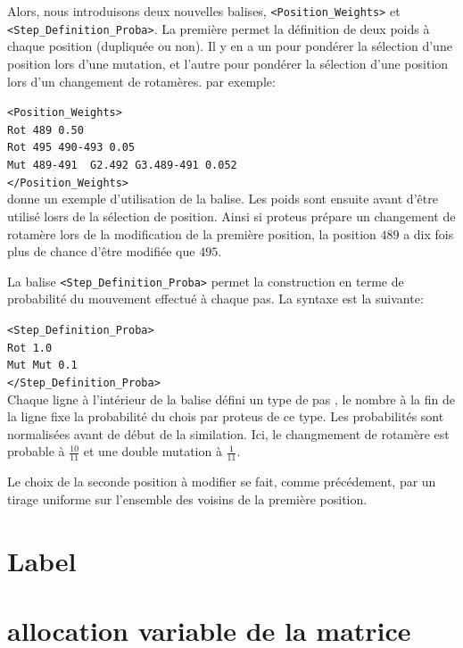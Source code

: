Alors, nous introduisons deux nouvelles balises, \verb!<Position_Weights>!  et \verb!<Step_Definition_Proba>!. La première permet la définition de deux poids à chaque position (dupliquée ou non). Il y en a un pour pondérer la sélection d'une position lors d'une mutation, et l'autre pour pondérer la sélection d'une position lors d'un changement de rotamères.
par exemple:

\verb!<Position_Weights>! \\
\verb!Rot 489 0.50 ! \\
\verb!Rot 495 490-493 0.05 ! \\
\verb!Mut 489-491  G2.492 G3.489-491 0.052 ! \\
\verb!</Position_Weights>! \\

donne un exemple d'utilisation de la balise. Les poids sont ensuite avant d'être utilisé losrs de la sélection de position. Ainsi si proteus prépare un changement de rotamère lors de la modification de la première position, la position $489$ a dix fois plus de chance d'être modifiée que $495$.



La balise \verb!<Step_Definition_Proba>! permet la construction en terme de probabilité du mouvement effectué à chaque pas. La syntaxe est la suivante:

\verb!<Step_Definition_Proba>! \\
\verb!Rot 1.0! \\
\verb!Mut Mut 0.1! \\
\verb!</Step_Definition_Proba>! \\

Chaque ligne à l'intérieur de la balise défini un type de pas , le nombre à la fin de la ligne fixe la probabilité du chois par proteus de ce type. Les probabilités sont normalisées avant de début de la similation. Ici, le changmement de rotamère est probable à $\frac{10}{11}$ et une double mutation à $\frac{1}{11}$.

Le choix de la seconde position à modifier se fait, comme précédement, par un tirage uniforme sur l'ensemble des voisins de la première position.



\section{Label}
\section{allocation variable de la matrice}

\clearpage


